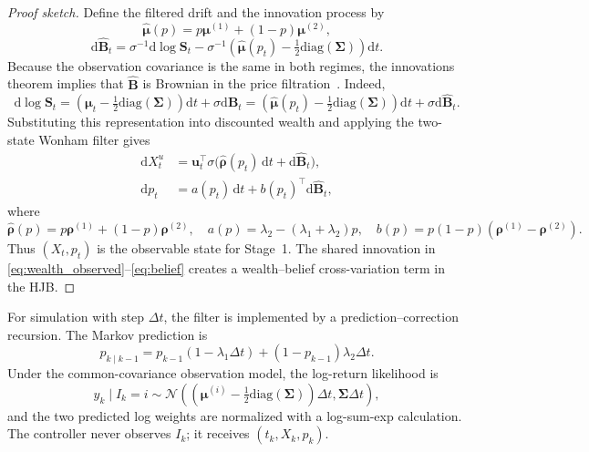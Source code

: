 \documentclass[a4paper,10pt]{article}
\newcommand{\N}{\mathcal{N}}
\newcommand{\dd}{\mathrm{d}}
\newcommand{\diag}{\mathrm{diag}}
\newcommand{\bmu}{\bm{\mu}}
\newcommand{\bu}{\bm{u}}
\newcommand{\bSigma}{\bm{\Sigma}}
\newcommand{\brho}{\bm{\rho}}
\newcommand{\bB}{\bm{B}}
\newcommand{\bBh}{\widehat{\bm{B}}}
\newcommand{\bS}{\bm{S}}
\begin{document}
\begin{proof}[Proof sketch]
Define the filtered drift and the innovation process by
\begin{equation}
\widehat{\bmu}(p)=p\bmu^{(1)}+(1-p)\bmu^{(2)},
\end{equation}
\begin{equation}
\dd\bBh_t
=\sigma^{-1}\dd\log\bS_t
-\sigma^{-1}\left(\widehat{\bmu}(p_t)-\tfrac12\diag(\bSigma)\right)\dd t.
\label{eq:innovation}
\end{equation}
Because the observation covariance is the same in both regimes, the innovations theorem implies that $\bBh$ is Brownian in the price filtration~\cite{wonham1964}. Indeed,
\begin{equation}
\dd\log\bS_t
=\left(\bmu_t-\tfrac12\diag(\bSigma)\right)\dd t+\sigma\dd\bB_t
=\left(\widehat{\bmu}(p_t)-\tfrac12\diag(\bSigma)\right)\dd t+\sigma\dd\bBh_t.
\end{equation}
Substituting this representation into discounted wealth and applying the two-state Wonham filter gives
\begin{align}
\dd X_t^{u}
&=\bu_t^\top\sigma\bigl(\widehat{\brho}(p_t)\,\dd t+\dd\bBh_t\bigr),
\label{eq:wealth_observed}\\
\dd p_t
&=a(p_t)\,\dd t+b(p_t)^\top\dd\bBh_t,
\label{eq:belief}
\end{align}
where
\begin{equation}
\widehat{\brho}(p)=p\brho^{(1)}+(1-p)\brho^{(2)},\quad
a(p)=\lambda_2-(\lambda_1+\lambda_2)p,\quad
b(p)=p(1-p)(\brho^{(1)}-\brho^{(2)}).
\end{equation}
Thus $(X_t,p_t)$ is the observable state for Stage~1. The shared innovation in \eqref{eq:wealth_observed}--\eqref{eq:belief} creates a wealth--belief cross-variation term in the HJB.
\end{proof}

For simulation with step $\Delta t$, the filter is implemented by a prediction--correction recursion. The Markov prediction is
\begin{equation}
p_{k\mid k-1}=p_{k-1}(1-\lambda_1\Delta t)+(1-p_{k-1})\lambda_2\Delta t.
\label{eq:common_prediction}
\end{equation}
Under the common-covariance observation model, the log-return likelihood is
\begin{equation}
y_k\mid I_k=i\sim\N\left(
\left(\bmu^{(i)}-\tfrac12\diag(\bSigma)\right)\Delta t,
\bSigma\Delta t
\right),
\end{equation}
and the two predicted log weights are normalized with a log-sum-exp calculation. The controller never observes $I_k$; it receives $(t_k,X_k,p_k)$.
\end{document}
